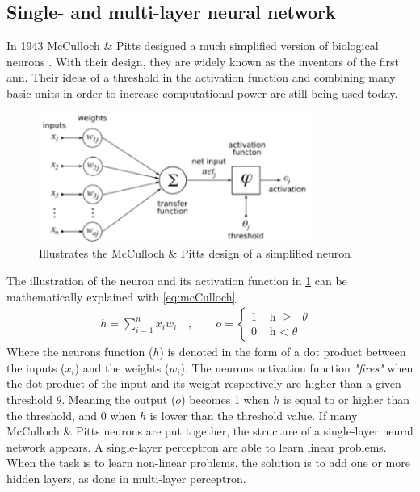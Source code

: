 \documentclass[USenglish]{ifimaster}  %
\begin{document}
\subsection{Single- and multi-layer neural network}
In 1943 McCulloch \& Pitts designed a much simplified version of biological neurons \cite{mcculloch_pitts}. With their design, they are widely known as the inventors of the first \ac{ann}. Their ideas of a threshold in the activation function and combining many basic units in order to increase computational power are still being used today.
\begin{figure}[ht]
    \centering
    \includegraphics[width=0.8\textwidth]{bilder/mcculloch_and_pitts.png}
    \caption{Illustrates the McCulloch \& Pitts design of a simplified neuron \cite{website:mcCulloch_img}}
    \label{fig:mcculoch_and_pitts}
\end{figure}
The illustration of the neuron and its activation function in \cref{fig:mcculoch_and_pitts} can be mathematically explained with \cref{eq:mcCulloch}.
\begin{equation}\label{eq:mcCulloch}
\begin{aligned}
    {h = \sum_{i=1}^{n} x_i w_i \quad , \quad\quad o =
\begin{cases}
    1 & \text{ h $\geq$ $\theta$ }  \\
    0 & \text{ h < $\theta$ }
\end{cases}}
\end{aligned}
\end{equation}
Where the neurons function ($h$) is denoted in the form of a dot product between the inputs ($x_i$) and the weights ($w_i$). The neurons activation function \textit{"fires"} when the dot product of the input and its weight respectively are higher than a given threshold $\theta$. Meaning the output ($o$) becomes 1 when $h$ is equal to or higher than the threshold, and 0 when $h$ is lower than the threshold value.
\newline
\newline
If many McCulloch \& Pitts neurons are put together, the structure of a single-layer neural network appears. A single-layer perceptron are able to learn linear problems. When the task is to learn non-linear problems, the solution is to add one or more hidden layers, as done in multi-layer perceptron.   
\end{document}
